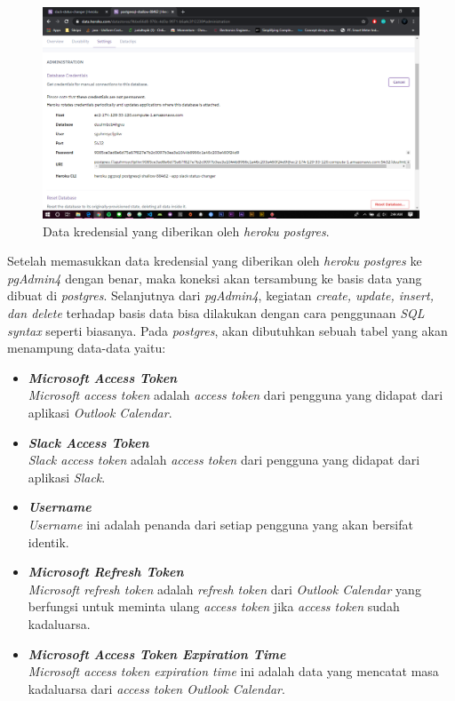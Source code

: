 \begin{figure}[h]
  \includegraphics[width=15cm]{./Gambar/postgres.png}
  \centering
  \caption{Data kredensial yang diberikan oleh \textit{heroku postgres}.}
  \label{fig:postgres}
\end{figure}

Setelah memasukkan data kredensial yang diberikan oleh \textit{heroku postgres} ke \textit{pgAdmin4} dengan benar, maka koneksi akan tersambung ke basis data yang dibuat di \textit{postgres}. Selanjutnya dari \textit{pgAdmin4}, kegiatan \textit{create, update, insert, dan delete} terhadap basis data bisa dilakukan dengan cara penggunaan \textit{SQL syntax} seperti biasanya. Pada \textit{postgres}, akan dibutuhkan sebuah tabel yang akan menampung data-data yaitu:
\begin{itemize}
    \item \textbf{\textit{Microsoft Access Token}}\\
    \textit{Microsoft access token} adalah \textit{access token} dari pengguna yang didapat dari aplikasi \textit{Outlook Calendar}. 
    \item \textbf{\textit{Slack Access Token}}\\
    \textit{Slack access token} adalah \textit{access token} dari pengguna yang didapat dari aplikasi \textit{Slack}. 
    \item \textbf{\textit{Username}}\\
    \textit{Username} ini adalah penanda dari setiap pengguna yang akan bersifat identik. 
    \item \textbf{\textit{Microsoft Refresh Token}}\\
    \textit{Microsoft refresh token} adalah \textit{refresh token} dari \textit{Outlook Calendar} yang berfungsi untuk meminta ulang \textit{access token} jika \textit{access token} sudah kadaluarsa.
    \item \textbf{\textit{Microsoft Access Token Expiration Time}}\\
    \textit{Microsoft access token expiration time} ini adalah data yang mencatat masa kadaluarsa dari \textit{access token Outlook Calendar}. 
\end{itemize}

